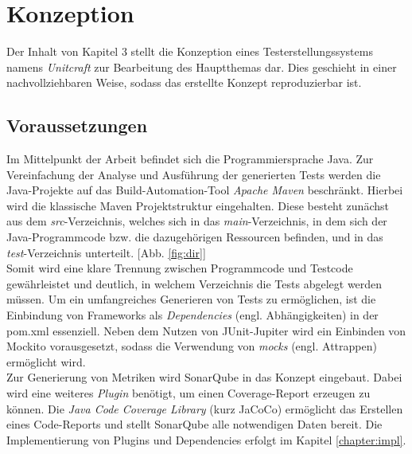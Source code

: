 \chapter{Konzeption}
Der Inhalt von Kapitel 3 stellt die Konzeption eines Testerstellungssystems namens \textit{Unitcraft} zur Bearbeitung des Hauptthemas dar. Dies geschieht in einer nachvollziehbaren Weise, sodass das erstellte Konzept reproduzierbar ist.

\section{Voraussetzungen}
Im Mittelpunkt der Arbeit befindet sich die Programmiersprache Java. Zur Vereinfachung der Analyse und Ausführung der generierten Tests werden die Java-Projekte auf das Build-Automation-Tool \textit{Apache Maven} beschränkt. Hierbei wird die klassische Maven Projektstruktur eingehalten. Diese besteht zunächst aus dem \textit{src}-Verzeichnis, welches sich in das \textit{main}-Verzeichnis, in dem sich der Java-Programmcode bzw. die dazugehörigen Ressourcen befinden, und in das \textit{test}-Verzeichnis unterteilt. \cite{MavenIntroductionStandard} [Abb. \ref{fig:dir}]\\ Somit wird eine klare Trennung zwischen Programmcode und Testcode gewährleistet und deutlich, in welchem Verzeichnis die Tests abgelegt werden müssen.  \newpage
Um ein umfangreiches Generieren von Tests zu ermöglichen, ist die Einbindung von Frameworks als \textit{Dependencies} (engl. Abhängigkeiten) in der pom.xml essenziell. Neben dem Nutzen von JUnit-Jupiter wird ein Einbinden von Mockito vorausgesetzt, sodass die Verwendung von \textit{mocks} (engl. Attrappen) ermöglicht wird.\\
Zur Generierung von Metriken wird SonarQube in das Konzept eingebaut. Dabei wird eine weiteres \textit{Plugin} benötigt, um einen Coverage-Report erzeugen zu können. Die \textit{Java Code Coverage Library} (kurz JaCoCo) ermöglicht das Erstellen eines Code-Reports und stellt SonarQube alle notwendigen Daten bereit.
Die Implementierung von Plugins und Dependencies erfolgt im Kapitel \ref{chapter:impl}.


